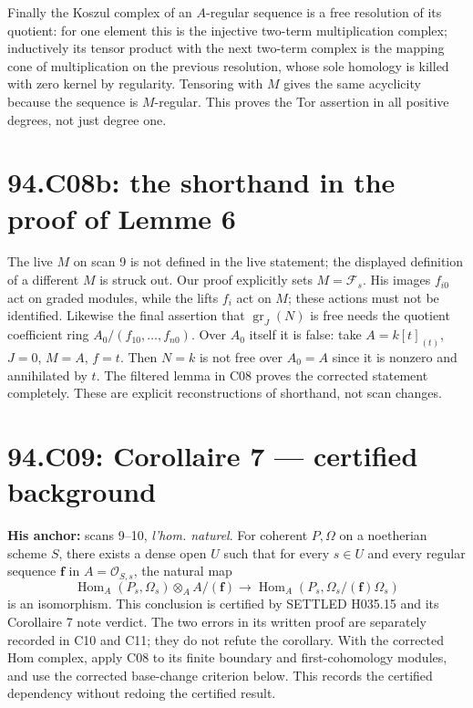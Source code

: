 \documentclass[11pt]{article}
\newcommand{\Hom}{\operatorname{Hom}}
\begin{document}
Finally the Koszul complex of an $A$-regular sequence is a free
resolution of its quotient: for one element this is the injective
two-term multiplication complex; inductively its tensor product with
the next two-term complex is the mapping cone of multiplication on
the previous resolution, whose sole homology is killed with zero
kernel by regularity. Tensoring with $M$ gives the same acyclicity
because the sequence is $M$-regular. This proves the Tor assertion in
all positive degrees, not just degree one.

\section{94.C08b: the shorthand in the proof of Lemme 6}
\label{C08b}
The live $M$ on scan 9 is not defined in the live statement; the
displayed definition of a different $M$ is struck out. Our proof
explicitly sets $M=\mathcal F_s$. His images $f_{i0}$ act on graded
modules, while the lifts $f_i$ act on $M$; these actions must not be
identified. Likewise the final assertion that
$\operatorname{gr}_J(N)$ is free needs the quotient coefficient ring
$A_0/(f_{10},\ldots,f_{n0})$. Over $A_0$ itself it is false: take
$A=k[t]_{(t)}$, $J=0$, $M=A$, $f=t$. Then $N=k$ is not free over
$A_0=A$ since it is nonzero and annihilated by $t$.
The filtered lemma in C08 proves the corrected statement completely.
These are explicit reconstructions of shorthand, not scan changes.

\section{94.C09: Corollaire 7 --- certified background}
\label{C09}
\textbf{His anchor:} scans 9--10, \emph{l'hom. naturel}.
For coherent $P,\Omega$ on a noetherian scheme $S$, there exists a
dense open $U$ such that for every $s\in U$ and every regular sequence
$\mathbf f$ in $A=\mathcal O_{S,s}$, the natural map
\[
 \Hom_A(P_s,\Omega_s)\otimes_A A/(\mathbf f)
 \longrightarrow\Hom_A(P_s,\Omega_s/(\mathbf f)\Omega_s)
\]
is an isomorphism. This conclusion is certified by SETTLED H035.15
and its Corollaire 7 note verdict. The two errors in its written proof
are separately recorded in C10 and C11; they do not refute the
corollary. With the corrected Hom complex, apply C08 to its finite
boundary and first-cohomology modules, and use the corrected
base-change criterion below. This records the certified dependency
without redoing the certified result.
\end{document}
